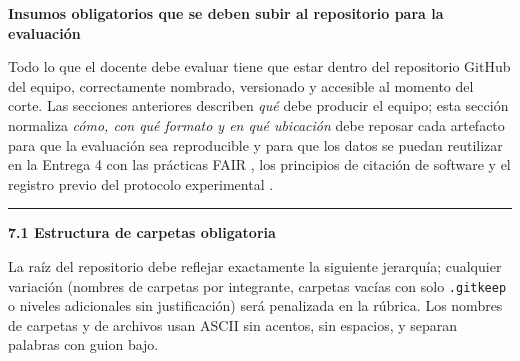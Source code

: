 \documentclass[11pt,a4paper]{article}
\newcounter{secc}
\newcommand{\secband}[1]{%
    \stepcounter{secc}\par\vspace{9pt}\noindent
    {\setlength{\fboxsep}{0pt}%
        \colorbox{uteqgold}{\parbox[c][20pt][c]{0.05\textwidth}{\centering\textbf{\color{white}\small \arabic{secc}}}}%
        \colorbox{uteqgreen}{\parbox[c][20pt][c]{0.95\textwidth}{\hspace{8pt}\textbf{\color{white}\small #1}}}%
    }\par\vspace{5pt}}
\newcommand{\submark}[1]{\par\vspace{4pt}\noindent
    {\color{uteqgreen}\rule[-1pt]{3.5pt}{12pt}}\hspace{6pt}\textbf{\color{uteqgreen}#1}\par\vspace{2pt}}
\begin{document}
\secband{Insumos obligatorios que se deben subir al repositorio para la evaluación}

Todo lo que el docente debe evaluar tiene que estar dentro del repositorio GitHub del equipo, correctamente nombrado, versionado y accesible al momento del corte.
Las secciones anteriores describen \emph{qué} debe producir el equipo; esta sección normaliza \emph{cómo, con qué formato y en qué ubicación} debe reposar cada artefacto para que la evaluación sea reproducible y para que los datos se puedan reutilizar en la Entrega 4 con las prácticas FAIR \cite{wilkinson2016fair}, los principios de citación de software \cite{smith2016force11} y el registro previo del protocolo experimental \cite{nosek2018preregistration}.

\submark{7.1 Estructura de carpetas obligatoria}
La raíz del repositorio debe reflejar exactamente la siguiente jerarquía; cualquier variación (nombres de carpetas por integrante, carpetas vacías con solo \texttt{.gitkeep} o niveles adicionales sin justificación) será penalizada en la rúbrica.
Los nombres de carpetas y de archivos usan ASCII sin acentos, sin espacios, y separan palabras con guion bajo.
\end{document}
